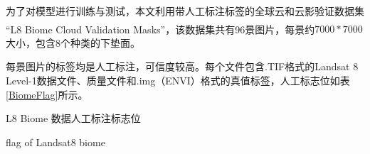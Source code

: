 \documentclass[10pt,UTF8,fntef]{ctexart}
\newcommand{\upcite}[1]{\textsuperscript{\textsuperscript{\cite{#1}}}}
\begin{document}
\begin{multicols}{2}
\begin{table}[H]
    \centering
    \label{landsatBand}
    \end{table}


为了对模型进行训练与测试，本文利用带人工标注标签的全球云和云影验证数据集
“L8 Biome Cloud Validation Masks”\upcite{foga2017cloud_data}，该数据集共有96景图片，每景约$7000*7000$大小，包含8个种类的下垫面。%


每景图片的标签均是人工标注，可信度较高。每个文件包含.TIF格式的Landsat 8 Level-1数据文件、质量文件和.img（ENVI）格式的真值标签，人工标志位如表\ref{BiomeFlag}所示。

\begin{table}[H]
    \caption{L8 Biome 数据人工标注标志位}
    \addtocounter{table}{-1}
    \vspace{-5pt}
    \renewcommand{\tablename}{Tab}
    \caption{flag of Landsat8 biome}
    \renewcommand{\tablename}{表}
    \vspace{5pt}


\end{table}
\end{multicols}
\end{document}
